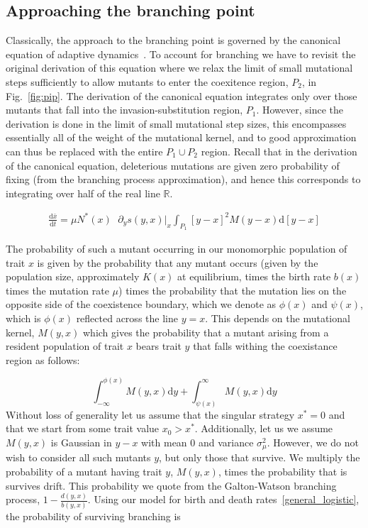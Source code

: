 \documentclass[authoryear,review,11pt]{elsarticle}
\newcommand{\ud}{\mathrm{d}}
\begin{document}
\subsection{Approaching the branching point}
Classically, the approach to the branching point is governed by the canonical equation of adaptive dynamics~\citep{dieckmann_jmb1996}.  To account for branching we have to revisit the original derivation of this equation where we relax the limit of small mutational steps sufficiently to allow mutants to enter the coexitence region, $P_2$, in Fig.~\ref{fig:pip}.  The derivation of the canonical equation integrates only over those mutants that fall into the invasion-substitution region, $P_1$.  However, since the derivation is done in the limit of small mutational step sizes, this encompasses essentially all of the weight of the mutational kernel, and to good approximation can thus be replaced with the entire $P_1 \cup P_2$ region.  Recall that in the derivation of the canonical equation, deleterious mutations are given zero probability of fixing (from the branching process approximation), and hence this corresponds to integrating over half of the real line $\mathbb{R}$.  

\begin{align}
\frac{\ud \bar x}{\ud t} = \mu N^*(x) \phantom \cdot \partial_y s(y,x) \Big|_x \int_{P_1} [y-x]^2 M(y-x) \ud [y-x]
\label{canonical}
\end{align}

The probability of such a mutant occurring in our monomorphic population of trait $x$ is given by the probability that any mutant occurs (given by the population size, approximately $K(x)$ at equilibrium, times the birth rate $b(x)$ times the mutation rate $\mu$) times the probability that the mutation lies on the opposite side of the coexistence boundary, which we denote as $\phi(x)$ and $\psi(x)$, which is $\phi(x)$ reflected across the line $y=x$.  This depends on the mutational kernel, $M(y,x)$ which gives the probability that a mutant arising from a resident population of trait $x$ bears trait $y$ that falls withing the coexistance region as follows:

\begin{equation*}
\int_{-\infty}^{\phi(x)} M(y,x) \ud y + \int_{\psi(x)}^{\infty} M(y,x) \ud y 
\end{equation*}
Without loss of generality let us assume that the singular strategy $x^* = 0$ and that we start from some trait value $x_0 > x^*$.  Additionally, let us we assume $M(y,x)$ is Gaussian in $y-x$ with mean 0 and variance $\sigma_{\mu}^2$. However, we do not wish to consider all such mutants $y$, but only those that survive.  We multiply the probability of a mutant having trait $y$, $M(y,x)$, times the probability that is survives drift.  This probability we quote from the Galton-Watson branching process, $1-\tfrac{d(y,x)}{b(y,x)}$. Using our model for birth and death rates~\eqref{general_logistic}, the probability of surviving branching is
\end{document}
